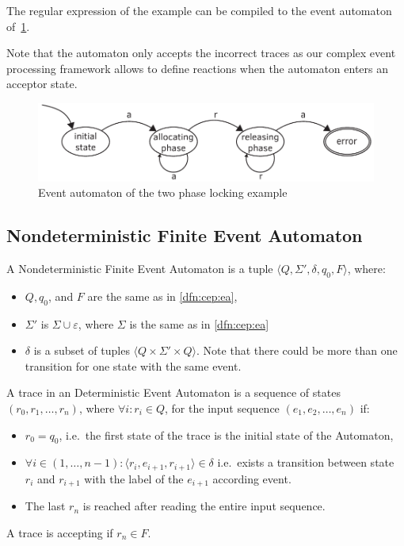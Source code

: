 	
			The regular expression of the example can be compiled to the event automaton of~\cref{fig:cep:fa}. 
	
			Note that the automaton only accepts the incorrect traces as our complex event processing framework allows to define reactions when the automaton enters an acceptor state.
			
			\begin{figure}[h]
			\centering
			\includegraphics[width=0.7\linewidth]{figures/chapter_4/allocating_simple}
			\caption{Event automaton of the two phase locking example \redraw}
			\label{fig:cep:fa}
			\end{figure}
		
		\subsection{Nondeterministic Finite Event Automaton}
		
		\begin{dfn}	
			\label{dfn:cep:nea}
			A Nondeterministic Finite Event Automaton is a tuple $\langle Q,\Sigma',\delta,q_0, F \rangle$, where:
			\begin{itemize}
				\item $Q, q_0$, and $F$ are the same as in \cref{dfn:cep:ea},
				\item $\Sigma'$ is $\Sigma \cup \varepsilon$, where $\Sigma$ is the same as in \cref{dfn:cep:ea}
				\item $\delta$ is a subset of tuples $\langle Q \times \Sigma' \times Q \rangle$.
				Note that there could be more than one transition for one state with the same event.
			\end{itemize}
		\end{dfn}
	
		\begin{dfn}
			\label{dfn:cep:nea:trace}
			A trace in an Deterministic Event Automaton is
			a sequence of states $(r_0, r_1, \dots, r_n)$, where $\forall i: r_i \in Q$,
			for the input sequence $(e_1, e_2, \dots, e_n)$ if:
			\begin{itemize}
				\item$r_0 = q_0$, i.e.~the first state of the trace is the initial state of the Automaton,
				\item $\forall i \in (1,\dots,n-1): \langle r_i, e_{i+1}, r_{i+1} \rangle \in \delta$ i.e.~exists a transition between state $r_i$ and $r_{i+1}$ with the label of the $e_{i+1}$ according event.	
				\item The last $r_n$ is reached after reading the entire input sequence.	
			\end{itemize}
			A trace is accepting if $r_n \in F$.
		\end{dfn}
			
